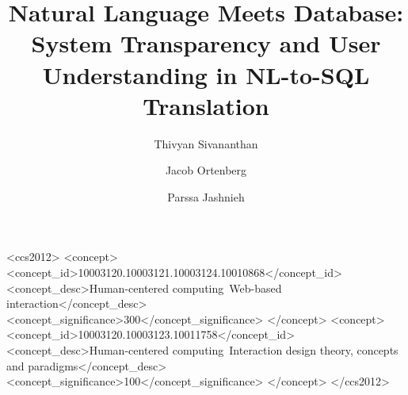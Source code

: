 \documentclass[manuscript,review]{acmart}
\begin{document}
\title{Natural Language Meets Database:
System Transparency and User
Understanding in NL-to-SQL
Translation}
\author{Thivyan Sivananthan}
\author{Jacob Ortenberg}
\author{Parssa Jashnieh}
\address{Bergische Universität Wuppertal}




\begin{CCSXML}
  <ccs2012>
     <concept>
         <concept_id>10003120.10003121.10003124.10010868</concept_id>
         <concept_desc>Human-centered computing~Web-based interaction</concept_desc>
         <concept_significance>300</concept_significance>
         </concept>
     <concept>
         <concept_id>10003120.10003123.10011758</concept_id>
         <concept_desc>Human-centered computing~Interaction design theory, concepts and paradigms</concept_desc>
         <concept_significance>100</concept_significance>
         </concept>
   </ccs2012>
\end{CCSXML}
  


\maketitle
\end{document}
